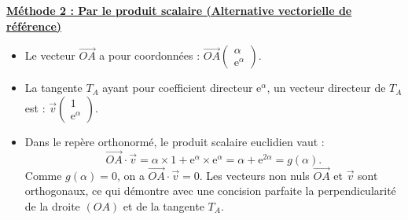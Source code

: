 \documentclass[11pt,a4paper]{article}
\newcommand{\e}{\mathrm{e}}
\begin{document}
\begin{correctionbox}
\underline{\textbf{Méthode 2 : Par le produit scalaire (Alternative vectorielle de référence)}}
\begin{itemize}[leftmargin=*]
    \item Le vecteur $\vec{OA}$ a pour coordonnées : $\vec{OA}\begin{pmatrix} \alpha \\ \e^\alpha \end{pmatrix}$.
    \item La tangente $T_A$ ayant pour coefficient directeur $\e^\alpha$, un vecteur directeur de $T_A$ est : $\vec{v}\begin{pmatrix} 1 \\ \e^\alpha \end{pmatrix}$.
    \item Dans le repère orthonormé, le produit scalaire euclidien vaut :
    \[
    \vec{OA} \cdot \vec{v} = \alpha \times 1 + \e^\alpha \times \e^\alpha = \alpha + \e^{2\alpha} = g(\alpha).
    \]
    Comme $g(\alpha) = 0$, on a $\vec{OA} \cdot \vec{v} = 0$.
    Les vecteurs non nuls $\vec{OA}$ et $\vec{v}$ sont orthogonaux, ce qui démontre avec une concision parfaite la perpendicularité de la droite $(OA)$ et de la tangente $T_A$.
\end{itemize}
\end{correctionbox}
\end{document}
